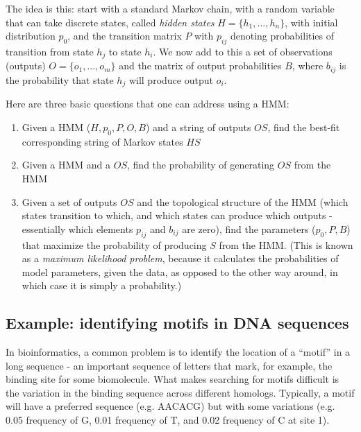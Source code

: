 \documentclass[11pt]{book}
\begin{document}
The idea is this: start with a standard Markov chain, with a random variable that can take discrete states, called \emph{hidden states} $H = \{h_1, ... , h_n \}$, with initial distribution $p_0$, and the transition matrix $P$ with $p_{ij}$ denoting probabilities of transition from state $h_j$ to state $h_i$. We now add to this a set of observations (outputs) $O = \{o_1, ... , o_m \}$ and the matrix of output probabilities $B$, where $b_{ij}$ is the probability that state $h_j$ will produce output $o_i$. 

Here are three basic questions that one can address using a HMM:
\begin{enumerate}

\item Given a HMM ($H, p_0, P, O, B$) and a string of outputs $OS$, find the best-fit corresponding string of Markov states $HS$

\item Given a HMM and a $OS$, find the probability of generating $OS$ from the HMM

\item Given a set of outputs $OS$ and the topological structure of the HMM (which states transition to which, and which states can produce which outputs - essentially which elements $p_{ij}$ and $b_{ij}$ are zero), find the parameters  ($p_0, P, B$) that maximize the probability of producing $S$ from the HMM. (This is known as a \emph{maximum likelihood problem}, because it calculates the probabilities of model parameters, given the data, as opposed to the other way around, in which case it is simply a probability.)
\end{enumerate}

\subsection{Example: identifying motifs in DNA sequences}
In bioinformatics, a common problem is to identify the location of a ``motif'' in a long sequence - an important sequence of letters that mark, for example, the binding site for some biomolecule. What makes searching for motifs difficult is the variation in the binding sequence across different homologs. Typically, a motif will have a preferred sequence (e.g. AACACG) but with some variations (e.g. 0.05 frequency of G, 0.01 frequency of T, and 0.02 frequency of C at site 1).
\end{document}
